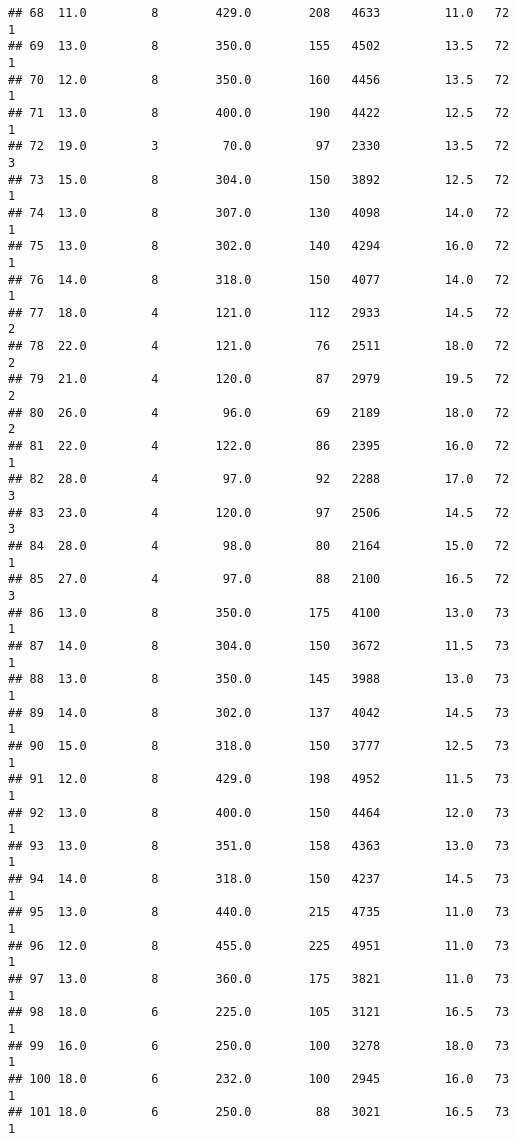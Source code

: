 \documentclass[
]{article}
\begin{document}
\begin{verbatim}
## 68  11.0         8        429.0        208   4633         11.0   72      1
## 69  13.0         8        350.0        155   4502         13.5   72      1
## 70  12.0         8        350.0        160   4456         13.5   72      1
## 71  13.0         8        400.0        190   4422         12.5   72      1
## 72  19.0         3         70.0         97   2330         13.5   72      3
## 73  15.0         8        304.0        150   3892         12.5   72      1
## 74  13.0         8        307.0        130   4098         14.0   72      1
## 75  13.0         8        302.0        140   4294         16.0   72      1
## 76  14.0         8        318.0        150   4077         14.0   72      1
## 77  18.0         4        121.0        112   2933         14.5   72      2
## 78  22.0         4        121.0         76   2511         18.0   72      2
## 79  21.0         4        120.0         87   2979         19.5   72      2
## 80  26.0         4         96.0         69   2189         18.0   72      2
## 81  22.0         4        122.0         86   2395         16.0   72      1
## 82  28.0         4         97.0         92   2288         17.0   72      3
## 83  23.0         4        120.0         97   2506         14.5   72      3
## 84  28.0         4         98.0         80   2164         15.0   72      1
## 85  27.0         4         97.0         88   2100         16.5   72      3
## 86  13.0         8        350.0        175   4100         13.0   73      1
## 87  14.0         8        304.0        150   3672         11.5   73      1
## 88  13.0         8        350.0        145   3988         13.0   73      1
## 89  14.0         8        302.0        137   4042         14.5   73      1
## 90  15.0         8        318.0        150   3777         12.5   73      1
## 91  12.0         8        429.0        198   4952         11.5   73      1
## 92  13.0         8        400.0        150   4464         12.0   73      1
## 93  13.0         8        351.0        158   4363         13.0   73      1
## 94  14.0         8        318.0        150   4237         14.5   73      1
## 95  13.0         8        440.0        215   4735         11.0   73      1
## 96  12.0         8        455.0        225   4951         11.0   73      1
## 97  13.0         8        360.0        175   3821         11.0   73      1
## 98  18.0         6        225.0        105   3121         16.5   73      1
## 99  16.0         6        250.0        100   3278         18.0   73      1
## 100 18.0         6        232.0        100   2945         16.0   73      1
## 101 18.0         6        250.0         88   3021         16.5   73      1

\end{verbatim}
\end{document}
